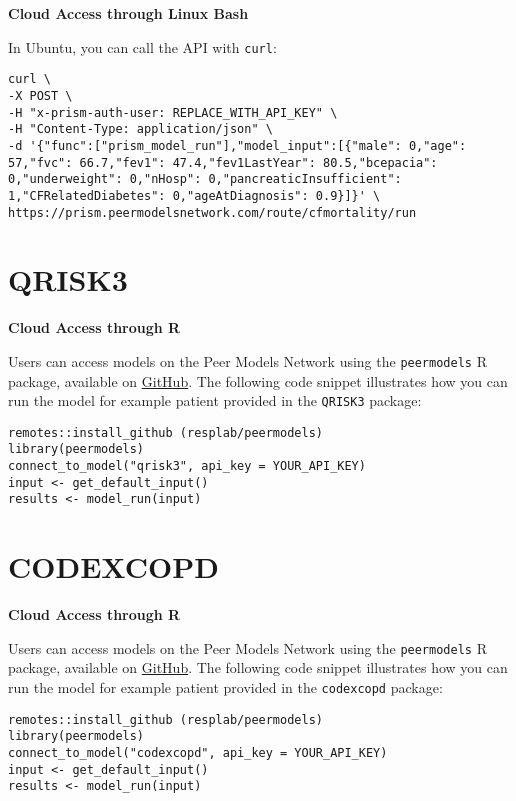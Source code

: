 \documentclass[
]{book}
\begin{document}
\textbf{Cloud Access through Linux Bash}

In Ubuntu, you can call the API with \texttt{curl}:

\begin{verbatim}
curl \
-X POST \
-H "x-prism-auth-user: REPLACE_WITH_API_KEY" \
-H "Content-Type: application/json" \
-d '{"func":["prism_model_run"],"model_input":[{"male": 0,"age": 57,"fvc": 66.7,"fev1": 47.4,"fev1LastYear": 80.5,"bcepacia": 0,"underweight": 0,"nHosp": 0,"pancreaticInsufficient": 1,"CFRelatedDiabetes": 0,"ageAtDiagnosis": 0.9}]}' \
https://prism.peermodelsnetwork.com/route/cfmortality/run
\end{verbatim}

\hypertarget{qrisk3-1}{%
\section{QRISK3}\label{qrisk3-1}}

\textbf{Cloud Access through R}

Users can access models on the Peer Models Network using the \texttt{peermodels} R package, available on \href{https://github.com/resplab/peermodels}{GitHub}. The following code snippet illustrates how you can run the model for example patient provided in the \texttt{QRISK3} package:

\begin{verbatim}
remotes::install_github (resplab/peermodels)
library(peermodels)
connect_to_model("qrisk3", api_key = YOUR_API_KEY)
input <- get_default_input()
results <- model_run(input)
\end{verbatim}

\hypertarget{codexcopd-1}{%
\section{CODEXCOPD}\label{codexcopd-1}}

\textbf{Cloud Access through R}

Users can access models on the Peer Models Network using the \texttt{peermodels} R package, available on \href{https://github.com/resplab/peermodels}{GitHub}. The following code snippet illustrates how you can run the model for example patient provided in the \texttt{codexcopd} package:

\begin{verbatim}
remotes::install_github (resplab/peermodels)
library(peermodels)
connect_to_model("codexcopd", api_key = YOUR_API_KEY)
input <- get_default_input()
results <- model_run(input)
\end{verbatim}
\end{document}
